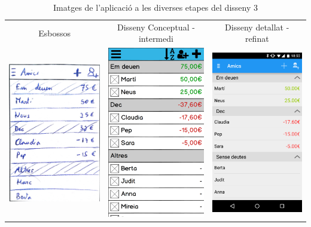 \begin{table}
\begin{tabular}{| c | c | c |}
\hline
Esbossos & Disseny Conceptual - intermedi & Disseny detallat - refinat \\
\includegraphics[width=50mm]{1_People.jpg} &
\includegraphics[width=50mm]{2_People.png} &
\includegraphics[width=50mm]{3_People.png}  \\
\hline
\end{tabular}
\caption{Imatges de l'aplicació a les diverses etapes del disseny 3}
\label{table:images_app3}
\end{table}

